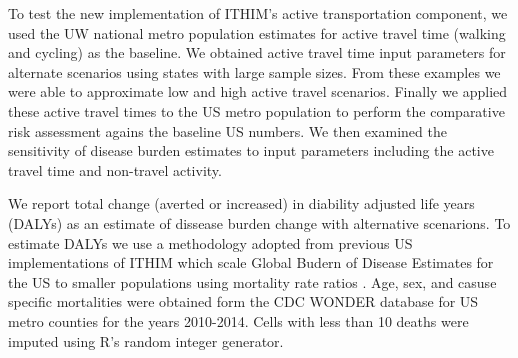 To test the new implementation of ITHIM's active transportation component, we used the UW national metro population estimates for active travel time (walking and cycling) as the baseline. We obtained active travel time input parameters for alternate scenarios using states with large sample sizes. From these examples we were able to approximate low and high active travel scenarios. Finally we applied these active travel times to the US metro population to perform the comparative risk assessment agains the baseline US numbers. We then examined the sensitivity of disease burden estimates to input parameters including the active travel time and non-travel activity. 

We report total change (averted or increased) in diability adjusted life years (DALYs) as an estimate of dissease burden change with alternative scenarions. To estimate DALYs we use a methodology adopted from previous US implementations of ITHIM  which scale Global Budern of Disease Estimates for the US to smaller populations using mortality rate ratios \cite{Maizlish2013}. Age, sex, and casuse specific mortalities were obtained form the CDC WONDER database for US metro counties for the years 2010-2014. Cells with less than 10 deaths were imputed using R's random integer generator.
